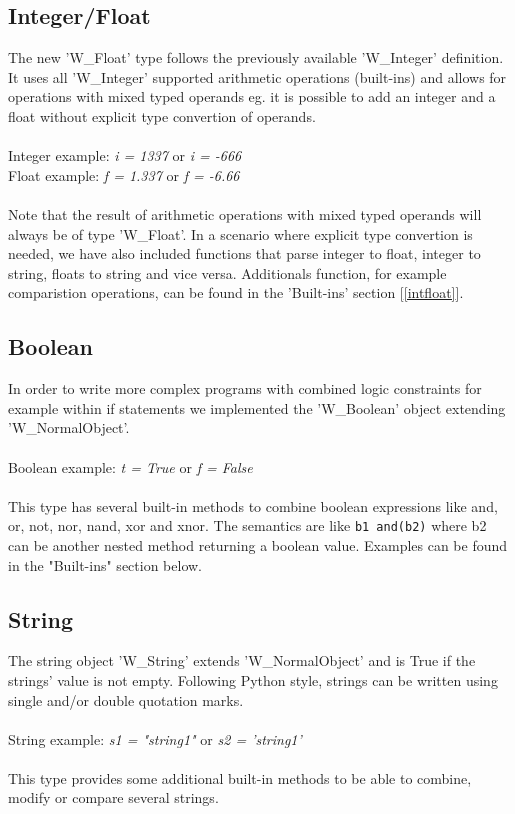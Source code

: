 \documentclass{article}
\begin{document}
\subsection{Integer/Float}
The new 'W\_Float' type follows the previously available 'W\_Integer' definition. It uses all 'W\_Integer' supported arithmetic operations (built-ins) and allows for operations with mixed typed operands eg. it is possible to add an integer and a float without explicit type convertion of operands. \\
\\ Integer example: \textit{i = 1337} or \textit{i = -666} 
\\ Float example: \textit{f = 1.337} or \textit{f = -6.66} \\\\
Note that the result of arithmetic operations with mixed typed operands will always be of type 'W\_Float'. In a scenario where explicit type convertion is needed, we have also included functions that parse integer to float, integer to string, floats to string and vice versa. Additionals function, for example comparistion operations, can be found in the 'Built-ins' section [\ref{intfloat}].

\subsection{Boolean}
In order to write more complex programs with combined logic constraints for example within if statements we implemented the 'W\_Boolean' object extending 'W\_NormalObject'.\\
\\ Boolean example: \textit{t = True} or \textit{f = False} \\\\
This type has several built-in methods to combine boolean expressions like and, or, not, nor, nand, xor and xnor.
The semantics are like \texttt{b1 and(b2)} where b2 can be another nested method returning a boolean value. Examples can be found in the "Built-ins" section below.


\subsection{String}
The string object 'W\_String' extends 'W\_NormalObject' and is True if the strings' value is not empty. Following Python style, strings can be written using single and/or double quotation marks.\\
\\ String example: \textit{s1 = "string1"} or \textit{s2 = 'string1'} \\\\
This type provides some additional built-in methods to be able to combine, modify or compare several strings.
\end{document}
